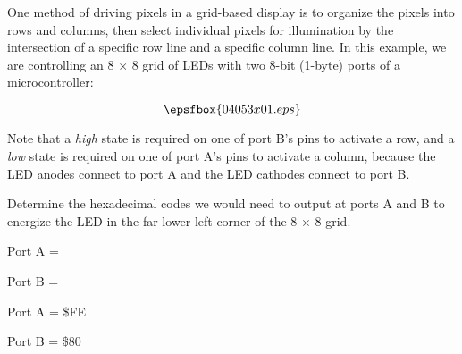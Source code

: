 

One method of driving pixels in a grid-based display is to organize the pixels into rows and columns, then select individual pixels for illumination by the intersection of a specific row line and a specific column line.  In this example, we are controlling an 8 $\times$ 8 grid of LEDs with two 8-bit (1-byte) ports of a microcontroller:

$$\epsfbox{04053x01.eps}$$

Note that a {\it high} state is required on one of port B's pins to activate a row, and a {\it low} state is required on one of port A's pins to activate a column, because the LED anodes connect to port A and the LED cathodes connect to port B.

\vskip 10pt

Determine the hexadecimal codes we would need to output at ports A and B to energize the LED in the far lower-left corner of the 8 $\times$ 8 grid.

\vskip 10pt

Port A = 

\vskip 10pt

Port B = 

\vskip 10pt







Port A = \$FE

\vskip 10pt

Port B = \$80











